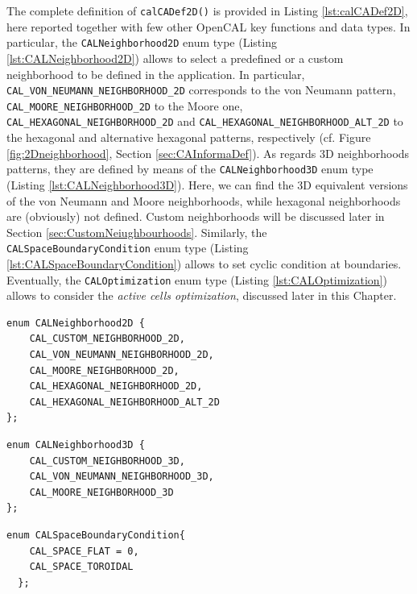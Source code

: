 The complete definition of \verb'calCADef2D()' is provided in Listing
\ref{lst:calCADef2D}, here reported together with few other OpenCAL
key functions and data types. In particular, the
\verb'CALNeighborhood2D' enum type (Listing
\ref{lst:CALNeighborhood2D}) allows to select a predefined or a custom
neighborhood to be defined in the application. In particular,
\verb'CAL_VON_NEUMANN_NEIGHBORHOOD_2D' corresponds to the von Neumann
pattern, \verb'CAL_MOORE_NEIGHBORHOOD_2D' to the Moore one,
\verb'CAL_HEXAGONAL_NEIGHBORHOOD_2D' and
\verb'CAL_HEXAGONAL_NEIGHBORHOOD_ALT_2D' to the hexagonal and
alternative hexagonal patterns, respectively (cf. Figure
\ref{fig:2Dneighborhood}, Section \ref{sec:CAInformaDef}). As regards
3D neighborhoods patterns, they are defined by means of the
\verb'CALNeighborhood3D' enum type (Listing
\ref{lst:CALNeighborhood3D}). Here, we can find the 3D equivalent
versions of the von Neumann and Moore neighborhoods, while hexagonal
neighborhoods are (obviously) not defined. Custom neighborhoods will
be discussed later in Section
\ref{sec:CustomNeiughbourhoods}. Similarly, the
\verb'CALSpaceBoundaryCondition' enum type (Listing
\ref{lst:CALSpaceBoundaryCondition}) allows to set cyclic
condition at boundaries. Eventually, the \verb'CALOptimization' enum
type (Listing \ref{lst:CALOptimization}) allows to consider the
\emph{active cells optimization}, discussed later in this Chapter.

\begin{lstlisting}[float,label=lst:CALNeighborhood2D, caption=The CALNeighborhood2D enum type., numbers=none]
  enum CALNeighborhood2D {
    CAL_CUSTOM_NEIGHBORHOOD_2D,
    CAL_VON_NEUMANN_NEIGHBORHOOD_2D,
    CAL_MOORE_NEIGHBORHOOD_2D,
    CAL_HEXAGONAL_NEIGHBORHOOD_2D,
    CAL_HEXAGONAL_NEIGHBORHOOD_ALT_2D
};
\end{lstlisting}

\begin{lstlisting}[float, label=lst:CALNeighborhood3D, caption=The CALNeighborhood3D enum type., numbers=none]
  enum CALNeighborhood3D {
    CAL_CUSTOM_NEIGHBORHOOD_3D,
    CAL_VON_NEUMANN_NEIGHBORHOOD_3D,
    CAL_MOORE_NEIGHBORHOOD_3D
};
\end{lstlisting}


\begin{lstlisting}[float, label=lst:CALSpaceBoundaryCondition, caption=The CALSpaceBoundaryCondition enum type., numbers=none]
  enum CALSpaceBoundaryCondition{
    CAL_SPACE_FLAT = 0,
    CAL_SPACE_TOROIDAL
  };
\end{lstlisting}

